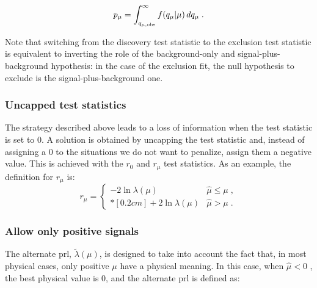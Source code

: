 \begin{equation}
\label{eq:stat:pmu}
p_{\mu} = \int_{q_{\mu,{\rm obs}}}^{\infty} f(q_{\mu} | \mu ) \, d q_{\mu} \;.
\end{equation}

\noindent Note that switching from the discovery test statistic to the exclusion test statistic is equivalent to inverting the role of the background-only and signal-plus-background hypothesis: in the case of the exclusion fit, the null hypothesis to exclude is the signal-plus-background one.


\subsubsection*{Uncapped test statistics}

The strategy described above leads to a loss of information when the test statistic is set to 0. A solution is obtained by uncapping the test statistic and, instead of assigning a 0 to the situations we do not want to penalize, assign them a negative value. This is achieved with the $r_0$ and $r_\mu$ test statistics. As an example, the definition for $r_\mu$ is:
\begin{equation}
\label{eq:rmu}
r_{\mu} =
\left\{ \! \! \begin{array}{ll}
               - 2 \ln \lambda(\mu)  & \hat{\mu} \le \mu  \;, \\*[0.2 cm]
               + 2 \ln \lambda(\mu)  & \hat{\mu} > \mu  \;.
              \end{array}
       \right.
\end{equation}

 
\subsubsection*{Allow only positive signals}

The alternate \gls{prl}, $\tilde{\lambda}({\mu})$, is designed to take into account the fact that, in most physical cases, only positive $\mu$ have a physical meaning. In this case, when $\hat{\mu} < 0$ , the best physical value is 0, and the alternate \gls{prl} is defined as: 

